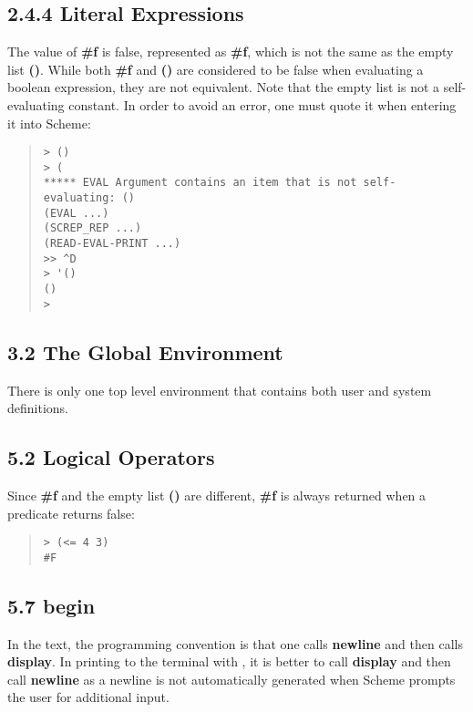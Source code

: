 \documentclass[10pt]{article}
\begin{document}
\subsection*{2.4.4 Literal Expressions}

The value of \textbf{\#f} is false, represented as \textbf{\#f}, which is
not the same as the empty list \textbf{()}.  While both \textbf{\#f} and
\textbf{()} are considered to be false when evaluating a boolean
expression, they are not equivalent.  Note that the empty list
is not a self-evaluating constant.  In order to avoid an
error, one must quote it when entering it into Scheme:

\begin{quote}
\begin{verbatim}
> ()
> (
***** EVAL Argument contains an item that is not self-evaluating: ()
(EVAL ...)
(SCREP_REP ...)
(READ-EVAL-PRINT ...)
>> ^D
> '()
()
>
\end{verbatim}
\end{quote}

\subsection*{3.2 The Global Environment}

There is only one top level environment that contains both
user and system definitions.

\subsection*{5.2 Logical Operators}

Since \textbf{\#f} and the empty list \textbf{()} are different, \textbf{\#f} is
always returned when a predicate returns false:

\begin{quote}
\begin{verbatim}
> (<= 4 3)
#F
\end{verbatim}
\end{quote}

\subsection*{5.7 begin}

In the text, the programming convention is that one calls
\textbf{newline} and then calls \textbf{display}.  In printing to the
terminal with \StoC, it is better to call \textbf{display} and
then call \textbf{newline} as a newline is not automatically
generated when Scheme prompts the user for additional input.
\end{document}
